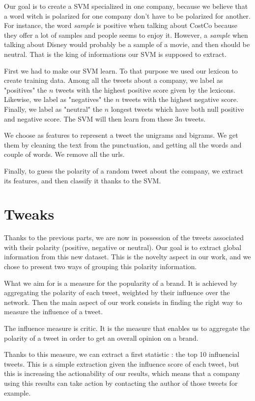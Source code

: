 \documentclass[a4paper,12pt]{report}
\begin{document}
Our goal is to create a SVM specialized in one company, because we believe that a word witch is polarized for one company don't have to be polarized for another.
For instance, the word \textit{sample} is positive when talking about CostCo because they offer a lot of samples and people seems to enjoy it. However, a \textit{sample} when talking about Disney would probably be a sample of a movie, and then should be neutral.
That is the king of informations our SVM is supposed to extract.

First we had to make our SVM learn. To that purpose we used our lexicon to create training data. Among all the tweets about a company, we label as "positives" the $n$ tweets with the highest positive score given by the lexicons. Likewise, we label as "negatives" the $n$ tweets with the highest negative score. Finally, we label as "neutral" the $n$ longest tweets which have both null positive and negative score. The SVM will then learn from these $3n$ tweets.

We choose as features to represent a tweet the unigrams and bigrams. We get them by cleaning the text from the punctuation, and getting all the words and couple of words. We remove all the urls.

Finally, to guess the polarity of a random tweet about the company, we extract its features, and then classify it thanks to the SVM.

\section{Tweaks}

Thanks to the previous parts, we are now in possession of the tweets associated with their polarity (positive, negative or neutral). Our goal is to extract global information from this new dataset.
This is the novelty aspect in our work, and we chose to present two ways of grouping this polarity information.

What we aim for is a measure for the popularity of a brand. It is achieved by aggregating the polarity of each tweet, weighted by their influence over the network.
Then the main aspect of our work consists in finding the right way to measure the influence of a tweet.

The influence measure is critic. It is the measure that enables us to aggregate the polarity of a tweet in order to get an overall opinion on a brand.

Thanks to this measure, we can extract a first statistic : the top 10 influencial tweets. This is a simple extraction given the influence score of each tweet, but this is increasing the actionability of our results, which means that a company using this results can take action by contacting the author of those tweets for example.
\end{document}
